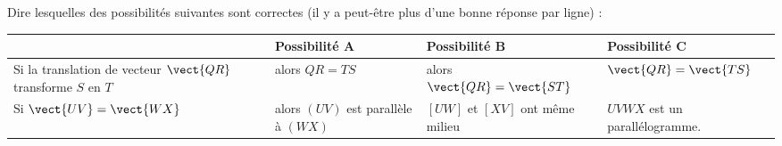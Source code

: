 
\begin{exercice}\label{exosmath-0593}

    Dire lesquelles des possibilités suivantes sont correctes (il y a peut-être plus d'une bonne réponse par ligne) :

    \begin{center}

        \begin{tabular}[]{|p{4.5cm}|p{4cm}|p{4cm}|p{4cm}|}
        \hline
        &Possibilité A&Possibilité B&Possibilité C\\
        \hline
        Si la translation de vecteur \( \vect{ QR }\) transforme \( S\) en \( T\)&alors \( QR=TS\)&alors \( \vect{ QR }=\vect{ ST }\)&\( \vect{ QR }=\vect{ TS }\)\\
        \hline
        Si \( \vect{ UV }=\vect{ WX }\)&alors \( (UV)\) est parallèle à \( (WX)\)&\( [UW]\) et \( [XV]\) ont même milieu&\( UVWX\) est un parallélogramme.\\
        \hline
    \end{tabular}
        
    \end{center}

\end{exercice}
